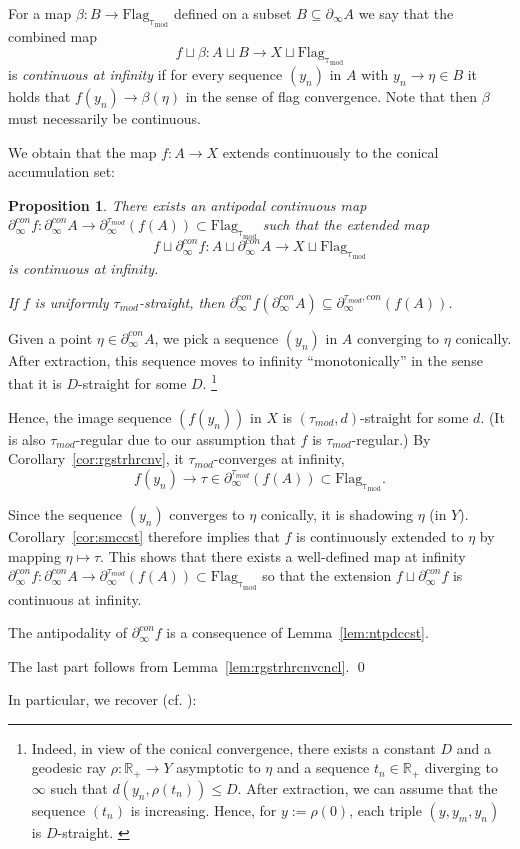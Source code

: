 \documentclass[12pt]{article}
\theoremstyle{boldplain}
\newtheorem{prop}[equation]{Proposition}
\theoremstyle{bolddefinition}
\numberwithin{equation}{section}
\def\R{{\mathbb R}}
\def\Flagt{\operatorname{Flag_{\tau_{mod}}}}
\def\geo{\partial_{\infty}}
\def\geoc{\partial_{\infty}^{con}}
\def\geot{\partial_{\infty}^{\tau_{mod}}}
\def\geotc{\partial_{\infty}^{\tau_{mod},con}}
\def\taumod{\tau_{mod}}
\begin{document}
For a map $\beta:B\to \Flagt$ defined on a subset $B\subseteq \geo A$ 
we say that the combined map
$$
f\sqcup \beta: A \sqcup B\to X\sqcup \Flagt
$$
is {\em continuous at infinity} if for every sequence $(y_n)$ in $A$ with $y_n\to\eta\in B$ it holds that 
$f(y_n)\to \beta(\eta)$
in the sense of flag convergence. 
Note that then $\beta$ must necessarily be continuous. 

We obtain that the map $f: A\to X$ extends continuously to the conical accumulation set:
\begin{prop}
\label{prop:bdmcnc}
There exists an antipodal continuous map $\geoc f:\geoc A\to\geot(f(A))\subset\Flagt$ such that the extended map 
$$ f\sqcup\geoc f:A\sqcup\geoc A \to X\sqcup\Flagt $$
is continuous at infinity.

If $f$ is uniformly $\taumod$-straight, then $\geoc f(\geoc A)\subseteq\geotc(f(A))$. 
\end{prop}
\proof 
Given a point $\eta\in \geoc A$, we pick a sequence $(y_n)$ in $A$ converging to $\eta$ conically. 
After extraction, this sequence moves to infinity ``monotonically''
in the sense that it is $D$-straight for some $D$. \footnote{{Indeed, in view of the conical convergence,  
there exists a constant $D$ and a geodesic ray $\rho: \R_+\to Y$ asymptotic to $\eta$ and a sequence $t_n\in \R_+$ 
diverging to $\infty$ such that 
$d(y_n, \rho(t_n))\le D$. After extraction, we can assume that the sequence $(t_n)$ is increasing. Hence, for $y:=\rho(0)$, each triple $(y, y_m, y_n)$ is $D$-straight. }      
}

Hence, the image sequence $(f(y_n))$ in $X$ is $(\taumod,d)$-straight for some $d$.
(It is also $\taumod$-regular due to our assumption that $f$ is $\taumod$-regular.)
By Corollary~\ref{cor:rgstrhrcnv},
it $\taumod$-converges at infinity,
$$ f(y_n) \to \tau\in\geot(f(A))\subset\Flagt .$$

Since the sequence $(y_n)$ converges to $\eta$ conically,
it is shadowing $\eta$ (in $Y$). 
Corollary~\ref{cor:smccst} therefore implies that 
$f$ is continuously extended to $\eta$ by mapping $\eta\mapsto\tau$.
This shows that 
there exists a well-defined map at infinity $\geoc f:\geoc A\to\geot(f(A))\subset\Flagt$ 
so that the extension $f\sqcup\geoc f$ is continuous at infinity.

The antipodality of $\geoc f$ is a consequence of Lemma~\ref{lem:ntpdccst}.

The last part follows from Lemma~\ref{lem:rgstrhrcnvcncl}.
\qed

\medskip
In particular, we recover (cf. \cite[Theorem 6.14]{mlem}):
\end{document}

